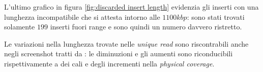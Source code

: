 L'ultimo grafico in figura \ref{fig:discarded insert length} evidenzia gli inserti con una lunghezza incompatibile che si attesta intorno alle $1100kbp$: sono stati trovati solamente $199$ inserti fuori range e sono quindi un numero davvero ristretto.

Le variazioni nella lunghezza trovate nelle \emph{unique read} sono riscontrabili anche negli screenshot tratti da : le diminuzioni e gli aumenti sono riconducibili rispettivamente a dei cali e degli incrementi nella \emph{physical coverage}.